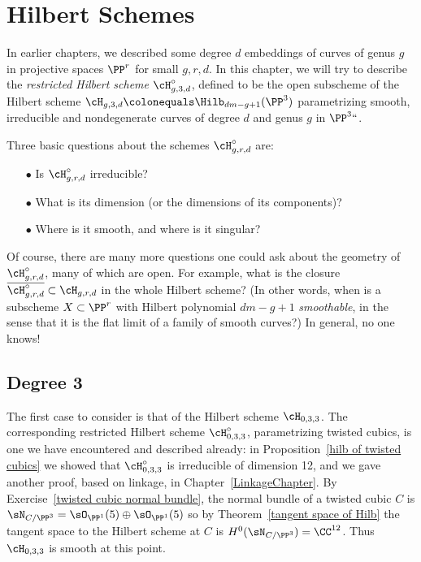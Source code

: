 
\chapter{Hilbert Schemes}
\label{HilbertSchemesChapter}

In earlier chapters, we described some  degree $d$ embeddings of curves
of  genus $g$ in projective spaces $\PP^r$ for small $g,r,d$. In this
chapter, we will try to describe the \emph{restricted Hilbert scheme}
%
%
%
$\cH^\circ_{g,3,d}$, defined to be the open subscheme of the Hilbert
scheme $\cH_{g,3,d} \colonequals  \Hilb_{dm-g+1}(\PP^3)$ parametrizing smooth,
%
%
irreducible and nondegenerate curves of degree $d$ and genus $g$
in $\PP^3` `$.

Three basic questions about the schemes $\cH^\circ_{g,r,d}$ are:

\begin{enumerate}
\item[$\bullet$] Is $\cH^\circ_{g,r,d}$ irreducible?
\item[$\bullet$]  What is its dimension (or the dimensions of its
components)?
\item[$\bullet$] Where is it smooth, and where is it singular?
\end{enumerate}

Of course, there are many more questions one could ask about the geometry
of $\cH^\circ_{g,r,d}$, many of which are open. For example,  what is the
closure $\overline{\cH^\circ_{g,r,d}} \subset \cH_{g,r,d}$ in the whole
Hilbert scheme? (In other words, when is a subscheme $X \subset \PP^r$
with Hilbert polynomial $dm-g+1$ \emph{smoothable}, in the sense that it
%
is the flat limit of a family of smooth curves?) In general, no one knows!


\section{Degree 3}\label{degree 3}

The first case to consider is that of the Hilbert scheme
$\cH_{0,3,3}$. The corresponding restricted Hilbert scheme
%
$\cH^\circ_{0,3,3}$, parametrizing
twisted cubics,
%
is one we have
encountered and described already: in Proposition~\ref{hilb of twisted
cubics} we showed that $\cH^\circ_{0,3,3}$ is irreducible of dimension 12,
%
and we gave another proof, based on linkage, in
Chapter~\ref{LinkageChapter}.
By Exercise~\ref{twisted cubic normal bundle}, the normal bundle of a
%
twisted cubic $C$ is $\sN_{C/\PP^3}=\sO_{\PP^1}(5)\oplus \sO_{\PP^1}(5)$
so by Theorem~\ref{tangent space of Hilb} the tangent space to the
Hilbert scheme at $C$ is
$H^0(\sN_{C/\PP^3}) = \CC^{12}$. Thus $\cH_{0,3,3}$ is smooth at this
point.

